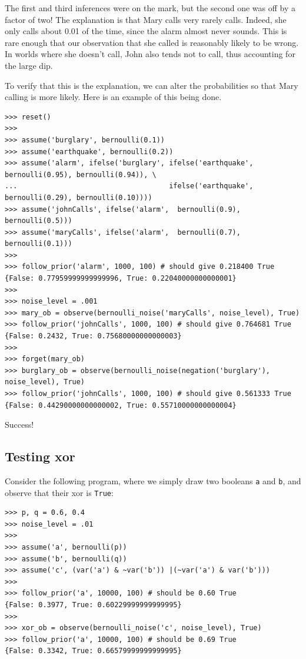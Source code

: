 \documentclass[11pt]{article}
\begin{document}
The first and third inferences were on the mark, but the second one was off by a factor of two!   The explanation is that Mary calls very rarely calls.  Indeed, she only calls about 0.01 of the time, since the alarm almost never sounds.  This is rare enough that our observation that she called is reasonably likely to be wrong.  In worlds where she doesn't call, John also tends not to call, thus accounting for the large dip. \vspace{6 pt}

To verify that this is the explanation, we can alter the probabilities so that Mary calling is more likely.  Here is an example of this being done.

\begin{small}
\begin{verbatim}
>>> reset()
>>>
>>> assume('burglary', bernoulli(0.1))
>>> assume('earthquake', bernoulli(0.2))
>>> assume('alarm', ifelse('burglary', ifelse('earthquake', bernoulli(0.95), bernoulli(0.94)), \
...                                    ifelse('earthquake', bernoulli(0.29), bernoulli(0.10))))
>>> assume('johnCalls', ifelse('alarm',  bernoulli(0.9), bernoulli(0.5)))
>>> assume('maryCalls', ifelse('alarm',  bernoulli(0.7), bernoulli(0.1)))
>>>
>>> follow_prior('alarm', 1000, 100) # should give 0.218400 True
{False: 0.77959999999999996, True: 0.22040000000000001}
>>>
>>> noise_level = .001
>>> mary_ob = observe(bernoulli_noise('maryCalls', noise_level), True)
>>> follow_prior('johnCalls', 1000, 100) # should give 0.764681 True
{False: 0.2432, True: 0.75680000000000003}
>>>
>>> forget(mary_ob)
>>> burglary_ob = observe(bernoulli_noise(negation('burglary'), noise_level), True)
>>> follow_prior('johnCalls', 1000, 100) # should give 0.561333 True
{False: 0.44290000000000002, True: 0.55710000000000004}
\end{verbatim}
\end{small}

\noindent Success!


\subsection{Testing xor}

\noindent Consider the following program, where we simply draw two booleans {\tt a} and {\tt b}, and observe that their xor is {\tt True}:

\begin{small}
\begin{verbatim}
>>> p, q = 0.6, 0.4
>>> noise_level = .01
>>>
>>> assume('a', bernoulli(p))
>>> assume('b', bernoulli(q))
>>> assume('c', (var('a') & ~var('b')) |(~var('a') & var('b')))
>>>
>>> follow_prior('a', 10000, 100) # should be 0.60 True
{False: 0.3977, True: 0.60229999999999995}
>>>
>>> xor_ob = observe(bernoulli_noise('c', noise_level), True)
>>> follow_prior('a', 10000, 100) # should be 0.69 True
{False: 0.3342, True: 0.66579999999999995}
\end{verbatim}
\end{small}
\end{document}
